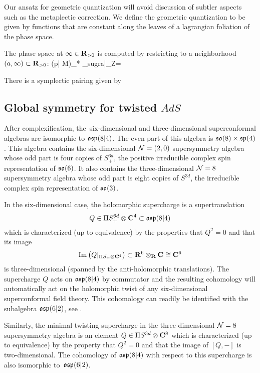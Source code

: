 Our ansatz for geometric quantization will avoid discussion of subtler aspects such as the metaplectic correction. We define the geometric quantization to be given by functions that are constant along the leaves of a lagrangian foliation of the phase space.

The phase space at $\infty\in \mathbf{R}_{>0}$ is computed by restricting to a neighborhood $(a, \infty)\subset \mathbf{R}_{>0}$:
\beqn
(p| \mathring M)_* \cL_{sugra}|_{\infty \times Z}=
\eeqn

There is a symplectic pairing given by
\beqn
\eeqn



\subsection{Global symmetry for twisted $AdS$}
\label{s:global1}

After complexification, the~six-dimensional and three-dimensional superconformal algebras are isomorphic to $\mathfrak{osp}(8|4)$.
The even part of this algebra is $\mathfrak{so}(8) \times \mathfrak{sp}(4)$.
This algebra contains the six-dimensional $\mathcal N=(2,0)$ supersymmetry algebra whose odd part is four copies of $S^{6d}_+$, the positive irreducible complex spin representation of $\mathfrak{so}(6)$.
It also contains the three-dimensional $\mathcal N=8$ supersymmetry algebra whose odd part is eight copies of $S^{3d}$, the irreducible complex spin representation of $\mathfrak{so}(3)$. 

In the six-dimensional case, the holomorphic supercharge is a supertranslation 
\[
Q \in \Pi S^{6d}_+ \otimes \mathbf{C}^4 \subset \mathfrak{osp}(8|4)
\]
which is characterized (up to equivalence) by the properties that $Q^2 = 0$ and that its image
\[
{\rm Im}\left(Q|_{\Pi S_+ \otimes \mathbf{C}^4} \right) \subset \mathbf{R}^6 \otimes_{\mathbf{R}} \mathbf{C} \cong \mathbf{C}^6
\]
is three-dimensional (spanned by the anti-holomorphic translations). 
The supercharge $Q$ acts on $\mathfrak{osp}(8|4)$ by commutator and the resulting cohomology will automatically act on the holomorphic twist of any six-dimensional superconformal field theory. 
This cohomology can readily be identified with the subalgebra $\mathfrak{osp}(6|2)$, see \cite{SWe36}. 

Similarly, the minimal twisting supercharge in the three-dimensional $\mathcal N=8$ supersymmetry algebra is an element $Q \in \Pi S^{3d} \otimes \mathbf{C}^8$ which is characterized (up to equivalence) by the property that $Q^2 = 0$ and that the image of $[Q,-]$ is two-dimensional. 
The cohomology of $\mathfrak{osp}(8|4)$ with respect to this supercharge is also isomorphic to~$\mathfrak{osp}(6|2)$. 

